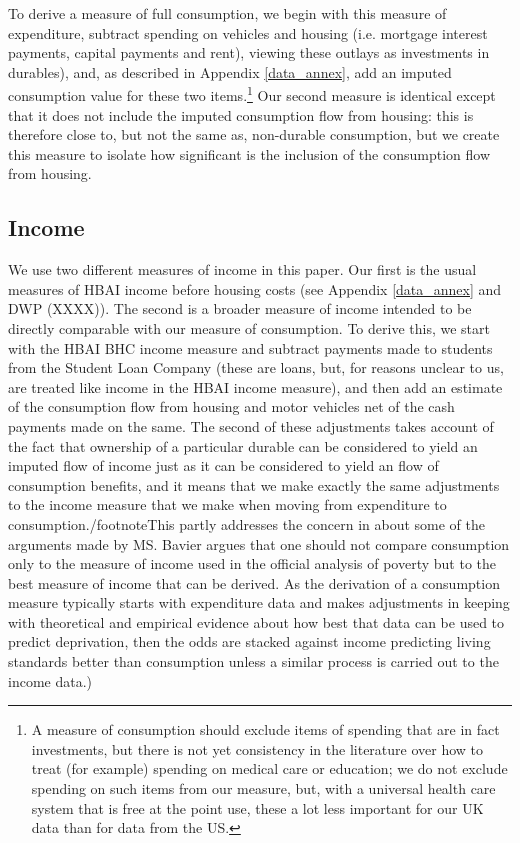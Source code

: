 To derive a measure of full consumption, we begin with this measure of expenditure, subtract spending on vehicles and housing (i.e. mortgage interest payments, capital payments and rent), viewing these outlays as investments in durables), and, as described in Appendix \ref{data_annex}, add an imputed consumption value for these two items.\footnote{A measure of consumption should exclude items of spending that are in fact investments, but there is not yet consistency in the literature over how to treat (for example) spending on medical care or education; we do not exclude spending on such items from our measure, but, with a universal health care system that is free at the point use, these a lot less important for our UK data than for data from the US.} Our second measure is identical except that it does not include the imputed consumption flow from housing: this is therefore close to, but not the same as, non-durable consumption, but we create this measure to isolate how significant is the inclusion of the consumption flow from housing. 


\subsection{Income}
We use two different measures of income in this paper.  Our first is the usual measures of HBAI income before housing costs (see Appendix \ref{data_annex} and DWP (XXXX)). The second is a broader measure of income intended to be directly comparable with our measure of consumption. To derive this, we start with the HBAI BHC income measure and subtract payments made to students from the Student Loan Company (these are loans, but, for reasons unclear to us, are treated like income in the HBAI income measure), and then add an estimate of the consumption flow from housing and motor vehicles net of the cash payments made on the same. The second of these adjustments takes account of the fact that ownership of a particular durable can be considered to yield an imputed flow of income just as it can be considered to yield an flow of consumption benefits, and it means that we make exactly the same adjustments to the income measure that we make when moving from expenditure to consumption./footnote{This partly addresses the concern in \cite{Bavier2008} about some of the arguments made by MS. Bavier argues that one should not compare consumption only to the measure of income used in the official analysis of poverty but to the best measure of income that can be derived. As the derivation of a consumption measure typically starts with expenditure data and makes adjustments in keeping with theoretical and empirical evidence about how best that data can be used to predict deprivation, then the odds are stacked against income predicting living standards better than consumption unless a similar process is carried out to the income data.}) 

